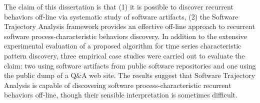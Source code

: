 \documentclass[11pt,oneside]{article}
\begin{document}
The claim of this dissertation is that (1) it is possible to discover recurrent behaviors off-line via systematic study of software artifacts, (2) the Software Trajectory Analysis framework provides an effective off-line approach to recurrent software process-characteristic behaviors discovery. In addition to the extensive experimental evaluation of a proposed algorithm for time series characteristic pattern discovery, three empirical case studies were carried out to evaluate the claim: two using software artifacts from public software repositories and one using the public dump of a Q\&A web site. The results suggest that Software Trajectory Analysis is capable of discovering software process-characteristic recurrent behaviors off-line, though their sensible interpretation is sometimes difficult.
\end{document}
